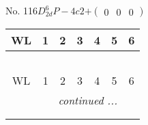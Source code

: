 \documentclass[fleqn,9pt,landscape]{jsarticle}
\begin{document}
\newpage
No. 116\quad$D_{2d}^{6}$\quad$P-4c2$\quad[ tetragonal ]\quad$+\begin{pmatrix} 0 & 0 & 0 \end{pmatrix}$
\begin{center}
\renewcommand{\arraystretch}{1.2}
\begin{longtable}{ccccccc}
 \hline \hline
WL & 1 & 2 & 3 & 4 & 5 & 6 \\ \hline \endfirsthead

\multicolumn{6}{l}{\tablename\ \thetable{}} \\
 \hline \hline
WL & 1 & 2 & 3 & 4 & 5 & 6 \\ \hline \endhead

 \hline \hline
\multicolumn{6}{r}{\footnotesize\it continued ...} \\ \endfoot

 \hline \hline
\multicolumn{6}{r}{} \\ \endlastfoot


\end{longtable}
\end{center}
\end{document}
